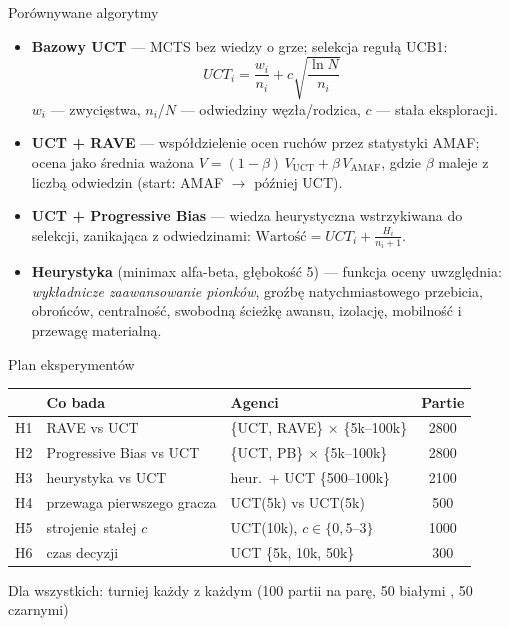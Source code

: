 \documentclass[aspectratio=169,11pt]{beamer}
\begin{document}
\begin{frame}{Porównywane algorytmy}
    \small
    \begin{itemize}
        \item \textbf{Bazowy UCT} — MCTS bez wiedzy o grze; selekcja regułą
              UCB1:
              \[ UCT_i = \frac{w_i}{n_i} + c\sqrt{\frac{\ln N}{n_i}} \]
              \vspace{-1ex}
              \footnotesize $w_i$ — zwycięstwa, $n_i$/$N$ — odwiedziny
              węzła/rodzica, $c$ — stała eksploracji.

        \item \textbf{UCT + RAVE} — współdzielenie ocen ruchów przez statystyki
              AMAF; ocena jako średnia ważona
              $V = (1-\beta)\,V_{\text{UCT}} + \beta\,V_{\text{AMAF}}$, gdzie
              $\beta$ maleje z liczbą odwiedzin (start: AMAF $\to$ później UCT).

        \item \textbf{UCT + Progressive Bias} — wiedza heurystyczna wstrzykiwana
              do selekcji, zanikająca z odwiedzinami:
              $\text{Wartość} = UCT_i + \frac{H_i}{n_i+1}$.

        \item \textbf{Heurystyka} (minimax alfa-beta, głębokość 5) — funkcja oceny
              uwzględnia: \emph{wykładnicze zaawansowanie pionków}, groźbę
              natychmiastowego przebicia, obrońców, centralność, swobodną ścieżkę
              awansu, izolację, mobilność i przewagę materialną.
    \end{itemize}
\end{frame}

\begin{frame}{Plan eksperymentów}
    \centering
    \renewcommand{\arraystretch}{1.35}
    \small
    \begin{tabular}{c l l c}
    \toprule
     & \textbf{Co bada} & \textbf{Agenci} & \textbf{Partie} \\
    \midrule
    H1 & RAVE vs UCT & \{UCT, RAVE\} $\times$ \{5k--100k\} & 2800 \\
    H2 & Progressive Bias vs UCT & \{UCT, PB\} $\times$ \{5k--100k\} & 2800 \\
    H3 & heurystyka vs UCT & heur.\ + UCT \{500--100k\} & 2100 \\
    H4 & przewaga pierwszego gracza & UCT(5k) vs UCT(5k) & 500 \\
    H5 & strojenie stałej $c$ & UCT(10k), $c\in\{0{,}5\text{--}3\}$ & 1000 \\
    H6 & czas decyzji & UCT \{5k, 10k, 50k\} & 300 \\
    \bottomrule
    \end{tabular}

    \vspace{2ex}
    {\footnotesize Dla wszystkich: turniej każdy z każdym (100 partii na parę, 50 białymi , 50 czarnymi)}
\end{frame}
\end{document}
